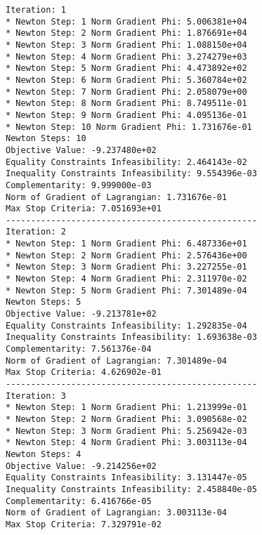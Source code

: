 \documentclass{article}
\begin{document}
\scriptsize
\begin{minipage}[t]{0.45\textwidth}
\begin{verbatim}
Iteration: 1
* Newton Step: 1 Norm Gradient Phi: 5.006381e+04
* Newton Step: 2 Norm Gradient Phi: 1.876691e+04
* Newton Step: 3 Norm Gradient Phi: 1.088150e+04
* Newton Step: 4 Norm Gradient Phi: 3.274279e+03
* Newton Step: 5 Norm Gradient Phi: 4.473892e+02
* Newton Step: 6 Norm Gradient Phi: 5.360784e+02
* Newton Step: 7 Norm Gradient Phi: 2.058079e+00
* Newton Step: 8 Norm Gradient Phi: 8.749511e-01
* Newton Step: 9 Norm Gradient Phi: 4.095136e-01
* Newton Step: 10 Norm Gradient Phi: 1.731676e-01
Newton Steps: 10
Objective Value: -9.237480e+02
Equality Constraints Infeasibility: 2.464143e-02
Inequality Constraints Infeasibility: 9.554396e-03
Complementarity: 9.999000e-03
Norm of Gradient of Lagrangian: 1.731676e-01
Max Stop Criteria: 7.051693e+01
--------------------------------------------------
Iteration: 2
* Newton Step: 1 Norm Gradient Phi: 6.487336e+01
* Newton Step: 2 Norm Gradient Phi: 2.576436e+00
* Newton Step: 3 Norm Gradient Phi: 3.227255e-01
* Newton Step: 4 Norm Gradient Phi: 2.311970e-02
* Newton Step: 5 Norm Gradient Phi: 7.301489e-04
Newton Steps: 5
Objective Value: -9.213781e+02
Equality Constraints Infeasibility: 1.292835e-04
Inequality Constraints Infeasibility: 1.693638e-03
Complementarity: 7.561376e-04
Norm of Gradient of Lagrangian: 7.301489e-04
Max Stop Criteria: 4.626902e-01
--------------------------------------------------
Iteration: 3
* Newton Step: 1 Norm Gradient Phi: 1.213999e-01
* Newton Step: 2 Norm Gradient Phi: 3.090568e-02
* Newton Step: 3 Norm Gradient Phi: 5.256942e-03
* Newton Step: 4 Norm Gradient Phi: 3.003113e-04
Newton Steps: 4
Objective Value: -9.214256e+02
Equality Constraints Infeasibility: 3.131447e-05
Inequality Constraints Infeasibility: 2.458840e-05
Complementarity: 6.416766e-05
Norm of Gradient of Lagrangian: 3.003113e-04
Max Stop Criteria: 7.329791e-02
\end{verbatim}
\end{minipage}
\end{document}
